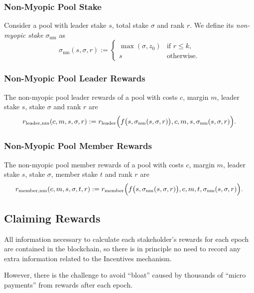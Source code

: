 \documentclass[11pt,a4paper]{article}
\begin{document}
\subsubsection{Non-Myopic Pool Stake}\label{non-myopic-pool-stake}

Consider a pool with leader stake \(s\), total stake \(\sigma\) and rank
\(r\). We define its \emph{non-myopic stake} \(\sigma_\mathrm{nm}\) as
\[
    \sigma_\mathrm{nm}(s,\sigma,r) :=
    \left\{
    \begin{array}{ll}
        \max(\sigma,z_0) &
        \text{if $r\leq k$,} \\
        s &
        \text{otherwise.}
    \end{array}
    \right.
\]

\subsubsection{Non-Myopic Pool Leader
Rewards}\label{non-myopic-pool-leader-rewards}

The non-myopic pool leader rewards of a pool with costs \(c\), margin
\(m\), leader stake \(s\), stake \(\sigma\) and rank \(r\) are \[
    r_\mathrm{leader, nm}(c, m, s, \sigma, r) :=
    r_\mathrm{leader}\Bigl(f\bigl(s,\sigma_\mathrm{nm}(s,\sigma, r)\bigr), c, m, s, \sigma_\mathrm{nm}(s,\sigma,r)\Bigr).
\]

\subsubsection{Non-Myopic Pool Member
Rewards}\label{non-myopic-pool-member-rewards}

The non-myopic pool member rewards of a pool with costs \(c\), margin
\(m\), leader stake \(s\), stake \(\sigma\), member stake \(t\) and rank
\(r\) are \[
    r_\mathrm{member, nm}(c, m, s, \sigma, t, r) :=
    r_\mathrm{member}\Bigl(f\bigl(s,\sigma_\mathrm{nm}(s,\sigma, r)\bigr), c, m, t, \sigma_\mathrm{nm}(s,\sigma,r)\Bigr).
\]

\subsection{Claiming Rewards}\label{claiming-rewards}

All information necessary to calculate each stakeholder's rewards for
each epoch are contained in the blockchain, so there is in principle no
need to record any extra information related to the Incentives
mechanism.

However, there is the challenge to avoid ``bloat'' caused by thousands
of ``micro payments'' from rewards after each epoch.
\end{document}
